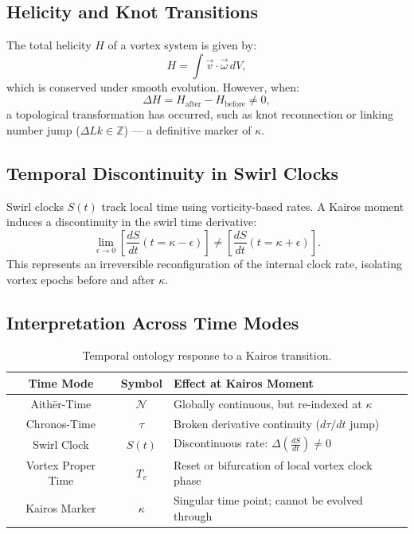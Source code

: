 \documentclass[a4paper,12pt]{article}
\begin{document}
    \subsection{Helicity and Knot Transitions}
    The total helicity \( H \) of a vortex system is given by:
    \begin{equation}
        H = \int \vec{v} \cdot \vec{\omega} \, dV,
    \end{equation}
    which is conserved under smooth evolution. However, when:
    \[
        \Delta H = H_{\text{after}} - H_{\text{before}} \neq 0,
    \]
    a topological transformation has occurred, such as knot reconnection or linking number jump (\( \Delta Lk \in \mathbb{Z} \)) — a definitive marker of \( \kappa \).

    \subsection{Temporal Discontinuity in Swirl Clocks}
    Swirl clocks \( S(t) \) track local time using vorticity-based rates. A Kairos moment induces a discontinuity in the swirl time derivative:
    \begin{equation}
        \lim_{\epsilon \to 0} \left[ \frac{dS}{dt}(t = \kappa - \epsilon) \right]
        \neq
        \left[ \frac{dS}{dt}(t = \kappa + \epsilon) \right].
    \end{equation}
    This represents an irreversible reconfiguration of the internal clock rate, isolating vortex epochs before and after \( \kappa \).

    \subsection{Interpretation Across Time Modes}

    \begin{table}[H]
        \centering
        \renewcommand{\arraystretch}{1.3}
        \begin{tabular}{|c|c|p{9cm}|}
            \hline
            \textbf{Time Mode} & \textbf{Symbol} & \textbf{Effect at Kairos Moment} \\
            \hline
            Aithēr-Time & \( \mathcal{N} \) & Globally continuous, but re-indexed at \(\kappa\) \\
            Chronos-Time & \( \tau \) & Broken derivative continuity (\( d\tau/dt \) jump) \\
            Swirl Clock & \( S(t) \) & Discontinuous rate: \( \Delta \left(\frac{dS}{dt}\right) \neq 0 \) \\
            Vortex Proper Time & \( T_v \) & Reset or bifurcation of local vortex clock phase \\
            Kairos Marker & \( \kappa \) & Singular time point; cannot be evolved through \\
            \hline
        \end{tabular}
        \caption{Temporal ontology response to a Kairos transition.}
    \end{table}
\end{document}
